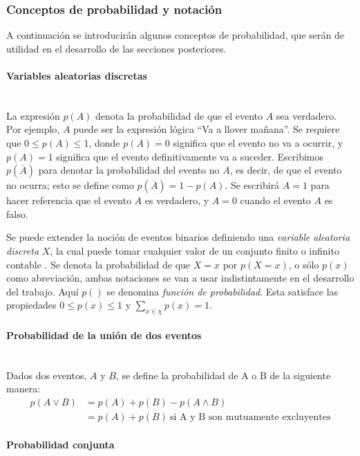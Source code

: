 \subsubsection{Conceptos de probabilidad y notación}
	A continuación se introducirán algunos conceptos de probabilidad, que serán de utilidad en el desarrollo de las secciones posteriores.

	\paragraph*{Variables aleatorias discretas} ~\\

		La expresión $p(A)$ denota la probabilidad de que el evento $A$ sea verdadero. Por ejemplo, $A$ puede ser la expresión lógica ``Va a llover mañana''. Se requiere que $0 \leq p(A) \leq 1$, donde $p(A)=0$ significa que el evento no va a ocurrir, y $p(A)=1$ significa que el evento definitivamente va a suceder. Escribimos $p(\overline{A})$ para denotar la probabilidad del evento no $A$, es decir, de que el evento no ocurra; esto se define como $p(\overline{A})=1-p(A)$. Se escribirá $A=1$ para hacer referencia que el evento $A$ es verdadero, y $A=0$ cuando el evento $A$ es falso.
		
		Se puede extender la noción de eventos binarios definiendo una \textit{variable aleatoria discreta} $X$, la cual puede tomar cualquier valor de un conjunto finito o infinito contable \scalebox{1.4}{$\chi$}. Se denota la probabilidad de que $X=x$ por $p(X=x)$, o sólo $p(x)$ como abreviación, ambas notaciones se van a usar indistintamente en el desarrollo del trabajo. Aquí $p()$ se denomina \textit{función de probabilidad}. Esta satisface las propiedades $0 \leq p(x) \leq 1$ y $\sum_{x \in \chi}p(x)=1$.
		
	\paragraph*{Probabilidad de la unión de dos eventos} ~\\
		
		Dados dos eventos, $A$ y $B$, se define la probabilidad de A o B de la siguiente manera:
		\begin{align}
			p(A \lor B) &= p(A) + p(B) - p(A \land B) \\
			&= p(A) + p(B) ~\text{si A y B son mutuamente excluyentes}
		\end{align}
		
	\paragraph*{Probabilidad conjunta} ~\\
	
